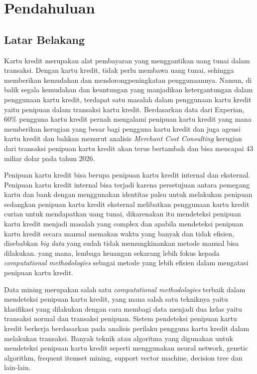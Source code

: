 \newpage
\newcommand{\kreditgede}{Your Value}

\chapter{Pendahuluan} \label{Bab I}
\section{Latar Belakang} \label{I.Latar Belakang}
Kartu kredit merupakan alat pembayaran yang menggantikan uang tunai dalam transaksi. Dengan kartu kredit, tidak perlu membawa uang tunai, sehingga memberikan kemudahan dan mendorongpeningkatan penggunaannya\cite{setiawan2022perlindungan}. Namun, di balik segala kemudahan dan keuntungan yang manjadikan ketergantungan dalam penggunaan kartu kredit, terdapat satu masalah dalam penggunaan kartu kredit yaitu penipuan dalam transaksi kartu kredit\cite{hendarsyah2020analisis}. Berdasarkan data dari Experian, 60\% pengguna kartu kredit pernah mengalami penipuan kartu kredit yang mana memberikan kerugian yang besar bagi pengguna kartu kredit dan juga agensi kartu kredit\cite{experian_2024} dan bahkan menurut analisis \textit{Merchant Cost Consulting} kerugian dari transaksi penipuan kartu kredit akan terus bertambah dan bisa mencapai 43 miliar dolar pada tahun 2026\cite{merchantcostconsulting_2024}.

Penipuan kartu kredit bisa berupa penipuan kartu kredit internal dan eksternal. Penipuan kartu kredit internal bisa terjadi karena persetujuan antara pemegang kartu dan bank dengan menggunakan identitas palsu untuk melakukan penipuan sedangkan penipuan kartu kredit eksternal melibatkan penggunaan kartu kredit curian untuk mendapatkan uang tunai\cite{chaudhary2012review}, dikarenakan itu mendeteksi penipuan kartu kredit menjadi masalah yang complex dan apabila mendeteksi penipuan kartu kredit secara manual memakan waktu yang banyak dan tidak efisien, disebabkan \textit{big data} yang sudah tidak memungkinankan metode manual bisa dilakukan. yang mana, lembaga keuangan sekarang lebih fokus kepada \textit{computational methodologies} sebagai metode yang lebih efisien dalam mengatasi penipuan kartu kredit\cite{west2016intelligent}.

Data mining merupakan salah satu \textit{computational methodologies} terbaik dalam mendeteksi penipuan kartu kredit, yang mana salah satu tekniknya yaitu klasifikasi yang dilakukan dengan cara membagi data menjadi dua kelas yaitu transaksi normal dan transaksi penipuan\cite{ngai2011application}. Sistem pendeteksi penipuan kartu kredit berkerja berdasarkan pada analisis perilaku pengguna kartu kredit dalam melakukan transaksi. Banyak teknik atau algoritma yang digunakan untuk mendeteksi penipuan kartu kredit seperti menggunakan neural network\cite{georgieva2019using}, genetic algorithm\cite{benchaji2019using}, frequent itemset mining\cite{seeja2014fraudminer}, support vector machine\cite{kumar2022credit}, decision tree\cite{gaikwad2014credit} dan lain-lain. 

